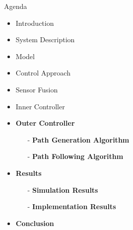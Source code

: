 
\begin{frame}{Agenda}{}
    \begin{itemize}
        \item Introduction
        \item System Description
        \item Model
        \item Control Approach
        \item Sensor Fusion
        \item Inner Controller
        \item \textcolor{aaublue}{\textbf{Outer Controller}}
        \begin{itemize}
            \item[-] \textcolor{aaublue}{\textbf{Path Generation Algorithm}}
            \item[-] \textcolor{aaublue}{\textbf{Path Following Algorithm}}
        \end{itemize}
        \item \textcolor{aaublue}{\textbf{Results}}
        \begin{itemize}
            \item[-] \textcolor{aaublue}{\textbf{Simulation Results}}
            \item[-] \textcolor{aaublue}{\textbf{Implementation Results}}
        \end{itemize}
        \item \textcolor{aaublue}{\textbf{Conclusion}}
    \end{itemize}
\end{frame}